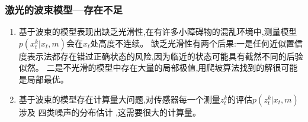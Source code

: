 \begin{comment}
1.爬山算法是一种简单的贪心搜索算法，该算法每次从当前解的临近解空间中选择一个最优解作为当前解，直到达到一个局部最优解。
  爬山算法实现很简单，其主要缺点是会陷入局部最优解
\end{comment}

\begin{frame}
  \frametitle{激光的波束模型---存在不足}
  \begin{enumerate}
    \item 基于波束的模型表现出{\color{red}缺乏光滑性},在有许多小障碍物的混乱环境中,测量模型$p(x_t^k|x_t, m)$会在$x_t$处高度不连续。
    缺乏光滑性有两个后果:一是任何近似置信度表示法都存在错过正确状态的风险,因为临近的状态可能具有截然不同的后验似然。
    二是不光滑的模型中存在大量的局部极值,用爬坡算法找到的解很可能是局部最优。
    \item 基于波束的模型存在{\color{red}计算量大问题},对传感器每一个测量$z_t^k$的评估$p(z_t^k|x_t, m)$涉及
    四类噪声的分布估计%
    ,这需要很大的计算量。
  \end{enumerate}
\end{frame}